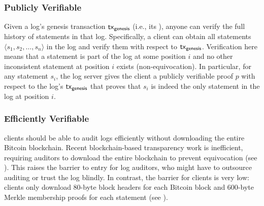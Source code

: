 \subsubsection{Publicly Verifiable}
Given a log's genesis transaction $\mathsf{tx}_{\textsf{genesis}}$ (i.e., its \pk), anyone can verify the full history of statements in that log.
Specifically, a client can obtain all statements $\langle s_1, s_2, \dots, s_n \rangle$ in the log and verify them with respect to $\mathsf{tx}_{\textsf{genesis}}$.
Verification here means that a statement is part of the log at some position $i$ and no other inconsistent statement at position $i$ exists (\ie non-equivocation).
In particular, for any statement $s_i$, the log server gives the client a publicly verifiable proof $p$ with respect to the log's $\mathsf{tx}_{\textsf{genesis}}$ that proves that $s_i$ is indeed the only statement in the log at position $i$.

\subsubsection{Efficiently Verifiable}
\label{sec:catena:goals:efficiency}
\Sys clients should be able to audit logs efficiently without downloading the entire Bitcoin blockchain.
Recent blockchain-based transparency work\cite{keybase,blockstack,coniks} is inefficient, requiring auditors to download the entire blockchain to prevent equivocation (see ).
This raises the barrier to entry for log auditors, who might have to outsource auditing or trust the log blindly.
In contrast, the barrier for \Sys clients is very low: clients only download 80-byte block headers for each Bitcoin block and 600-byte Merkle membership proofs for each statement (see ).

